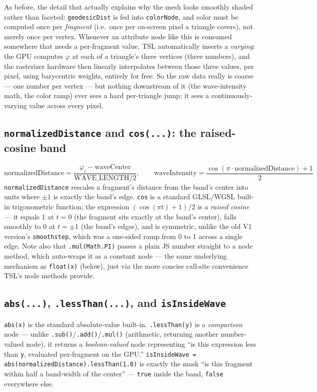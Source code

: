 \documentclass[11pt]{article}
\newcommand{\code}[1]{\texttt{#1}}
\newcommand{\func}[1]{\texttt{\textbf{#1}}}
\begin{document}
As before, the detail that actually explains why the mesh looks smoothly shaded rather than
faceted: \code{geodesicDist} is fed into \code{colorNode}, and color must be computed once
per \emph{fragment} (i.e.\ once per on-screen pixel a triangle covers), not merely once per
vertex. Whenever an attribute node like this is consumed somewhere that needs a
per-fragment value, TSL automatically inserts a \emph{varying}: the GPU computes
$\varphi$ at each of a triangle's three vertices (three numbers), and the rasterizer
hardware then linearly interpolates between those three values, per pixel, using
barycentric weights, entirely for free. So the raw data really is coarse --- one number per
vertex --- but nothing downstream of it (the wave-intensity math, the color ramp) ever sees
a hard per-triangle jump; it sees a continuously-varying value across every pixel.

\subsection*{\func{normalizedDistance} and \func{cos(...)}: the raised-cosine band}
\[
  \text{normalizedDistance} = \frac{\varphi_i - \text{waveCenter}}{\text{WAVE\_LENGTH}/2},
  \qquad
  \text{waveIntensity} = \frac{\cos(\pi \cdot \text{normalizedDistance}) + 1}{2}
\]
\code{normalizedDistance} rescales a fragment's distance from the band's center into units
where $\pm1$ is exactly the band's edge. \code{cos} is a standard GLSL/WGSL built-in
trigonometric function; the expression $(\cos(\pi t)+1)/2$ is a \emph{raised cosine} --- it
equals $1$ at $t=0$ (the fragment sits exactly at the band's center), falls smoothly to $0$
at $t=\pm1$ (the band's edges), and is symmetric, unlike the old V1 version's
\code{smoothstep}, which was a one-sided ramp from $0$ to $1$ across a single edge. Note
also that \code{.mul(Math.PI)} passes a plain JS number straight to a node method, which
auto-wraps it as a constant node --- the same underlying mechanism as \code{float(x)}
(below), just via the more concise call-site convenience TSL's node methods provide.

\subsection*{\func{abs(...)}, \func{.lessThan(...)}, and \func{isInsideWave}}
\code{abs(x)} is the standard absolute-value built-in. \code{.lessThan(y)} is a
\emph{comparison} node --- unlike \code{.sub()}/\code{.add()}/\code{.mul()} (arithmetic,
returning another number-valued node), it returns a \emph{boolean-valued} node representing
``is this expression less than \code{y}, evaluated per-fragment on the GPU.''
\code{isInsideWave = abs(normalizedDistance).lessThan(1.0)} is exactly the mask ``is this
fragment within half a band-width of the center'' --- \code{true} inside the band,
\code{false} everywhere else.
\end{document}
